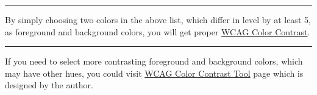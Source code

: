 \documentclass{article}
\begin{document}
\bigskip

\NineTestBack

\bigskip

\NineTestFore

\bigskip
\hrule
\bigskip

By simply choosing two colors in the above list, which differ in level by at least 5,
as foreground and background colors, you will get proper
\href{https://www.w3.org/WAI/WCAG21/Understanding/contrast-minimum.html}{WCAG Color Contrast}.

\bigskip

\NineTestContrast

\bigskip
\hrule
\bigskip

If you need to select more contrasting foreground and background colors, which may have other hues,
you could visit \href{https://lvjr.bitbucket.io/contrast.html}{WCAG Color Contrast Tool}
page which is designed by the author.
\end{document}
